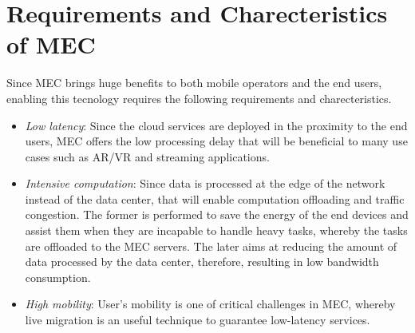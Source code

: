\section{Requirements and Charecteristics of MEC}  \label{requirements}

Since MEC brings huge benefits to both mobile operators and the end users, enabling this tecnology requires the following requirements and charecteristics.

\begin{itemize}

\item \textit{\textit{Low latency}}: Since the cloud services are deployed in the proximity to the end users, MEC offers the low processing delay that will be beneficial to many use cases such as AR/VR and streaming applications.

\item \textit{\textit{Intensive computation}}: Since data is processed at the edge of the network instead of the data center, that will enable computation offloading and traffic congestion. The former is performed to save the energy of the end devices and assist them when they are incapable to handle heavy tasks, whereby the tasks are offloaded to the MEC servers. The later aims at reducing the amount of data processed by the data center, therefore, resulting in low bandwidth consumption.

\item \textit{\textit{High mobility}}: User's mobility is one of critical challenges in MEC, whereby live migration is an useful technique to guarantee low-latency services.

\end{itemize}
